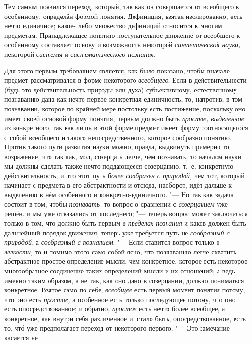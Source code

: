 Тем самым появился переход, который, так как он совершается от
всеобщего к особенному, определён формой понятия. Дефиниция, взятая
изолированно, есть нечто единичное; какое- либо множество дефиниций
относится к многим предметам. Принадлежащее понятию поступательное движение
от всеобщего к особенному составляет основу и возможность некоторой
{\em синтетической науки,}
некоторой {\em системы}
и {\em систематического
познания}.

Для этого первым требованием является, как было показано,
чтобы вначале предмет рассматривался в форме некоторого
{\em всеобщего}. Если в
действительности (будь это действительность природы или духа)
субъективному, естественному познаванию дана как нечто первое конкретная
единичность, то, напротив, в том познавании, которое по крайней мере
постольку есть постижение, поскольку оно имеет своей основой форму понятия,
первым должно быть {\em простое,
выделенное} из конкретного, так как лишь в этой форме
предмет имеет форму соотносящегося с собой всеобщего и такого
непосредственного, которое сообразно понятию. Против такого пути развития
науки можно, правда, выдвинуть примерно то возражение, что так как, мол,
созерцать легче, чем познавать, то началом науки мы должны
сделать также нечто поддающееся созерцанию, т.~е. конкретную
действительность, и что этот путь
{\em более сообразен с природой,}
чем тот, который начинает с предмета в его абстрактности и
отсюда, наоборот, идёт дальше к выделению в нём особенного и
конкретно-единичного. "--- Но так как задача состоит в том,
чтобы {\em познавать,} то
вопрос о сравнении с {\em созерцанием}
уже решён, и мы уже отказались от последнего;
"--- теперь вопрос может заключаться только в том, что должно
быть первым {\em в пределах познания}
и каков должен быть дальнейший порядок движения; теперь уже
требуется путь не {\em сообразный с
природой,} а{\em
сообразный с познанием}. "--- Если ставится
вопрос только о {\em лёгкости,}
то и помимо этого само собой ясно, что познаванию легче
схватить абстрактное простое определение мысли, чем конкретное, которое
есть некоторое многообразное соединение таких определений мысли и их
отношений; а ведь именно таким образом, а не так, как оно дано в
созерцании, должно пониматься конкретное. Взятое само по себе,
{\em всеобщее} есть
первый момент понятия потому, что оно есть
{\em простое,} а
особенное есть только последующее потому, что оно есть опосредствованное; и
обратно, {\em простое}
есть нечто более всеобщее, а конкретное, как внутри себя
различенное и, стало быть, опосредствованное, есть то, чт\'{о} уже предполагает
переход от некоторого первого. "--- Это замечание касается не
